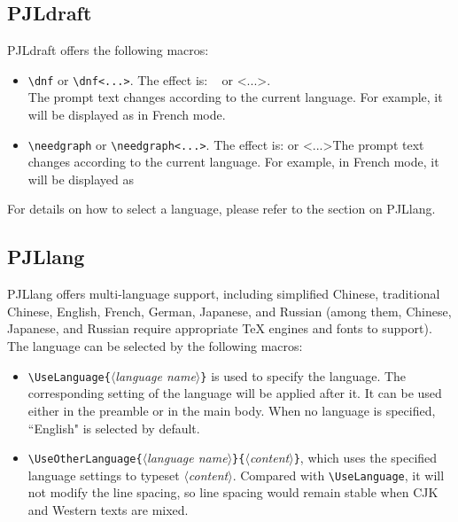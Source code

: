 \documentclass[allowbf]{lebhart}
\providecommand{\meta}[1]{$\langle${\normalfont\itshape#1}$\rangle$}
\providecommand{\PJLdraft}{\textsf{PJLdraft}}
\providecommand{\PJLlang}{\textsf{PJLlang}}
\begin{document}
\subsection{PJLdraft}

\PJLdraft{} offers the following macros:
\begin{itemize}
    \item \lstinline|\dnf| or \lstinline|\dnf<...>|. The effect is: \dnf~ or \dnf<...>. \\The prompt text changes according to the current language. For example, it will be displayed as  in French mode.
    \item \lstinline|\needgraph| or \lstinline|\needgraph<...>|. The effect is: \needgraph or \needgraph<...>The prompt text changes according to the current language. For example, in French mode, it will be displayed as 
\end{itemize}

For details on how to select a language, please refer to the section on \PJLlang{}.

\subsection{PJLlang}

\PJLlang{} offers multi-language support, including simplified Chinese, traditional Chinese, English, French, German, Japanese, and Russian (among them, Chinese, Japanese, and Russian require appropriate \TeX{} engines and fonts to support). The language can be selected by the following macros:

\begin{itemize}
    \item \lstinline|\UseLanguage{|\meta{language name}\lstinline|}| is used to specify the language. The corresponding setting of the language will be applied after it. It can be used either in the preamble or in the main body. When no language is specified, ``English" is selected by default.
    \item \lstinline|\UseOtherLanguage{|\meta{language name}\lstinline|}{|\meta{content}\lstinline|}|, which uses the specified language settings to typeset \meta{content}. Compared with \lstinline|\UseLanguage|, it will not modify the line spacing, so line spacing would remain stable when CJK and Western texts are mixed.
\end{itemize}
\end{document}
